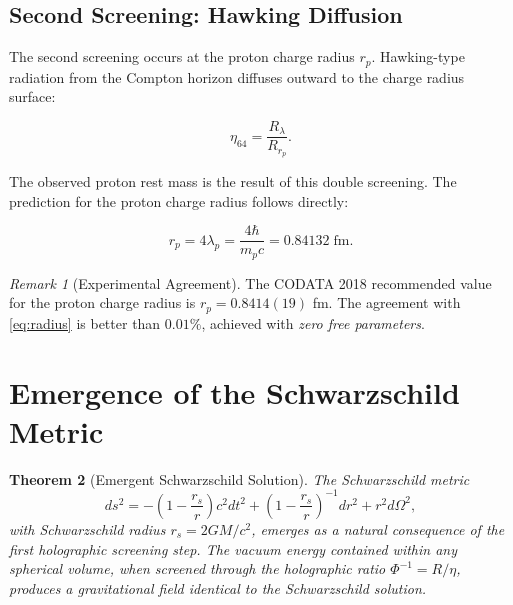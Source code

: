 \documentclass[12pt, a4paper]{article}
\theoremstyle{plain}
\newtheorem{theorem}{Theorem}[section]
\theoremstyle{definition}
\theoremstyle{remark}
\newtheorem{remark}[theorem]{Remark}
\newcommand{\rp}{r_p}
\begin{document}
\subsection{Second Screening: Hawking Diffusion}

The second screening occurs at the proton charge radius $\rp$. Hawking-type
radiation from the Compton horizon diffuses outward to the charge radius
surface:

\begin{equation}
  \eta_{64} = \frac{R_\lambda}{R_{\rp}}.
\end{equation}

The observed proton rest mass is the result of this double screening.
The prediction for the proton charge radius follows directly:

\begin{equation}\label{eq:radius}
  \rp = 4\lambda_p = \frac{4\hbar}{m_p c} = 0.84132 \; \text{fm}.
\end{equation}

\begin{remark}[Experimental Agreement]
  The CODATA 2018 recommended value \citep{CODATA2018} for the proton charge
  radius is $\rp = 0.8414(19)$ fm. The agreement with \eqref{eq:radius}
  is better than $0.01\%$, achieved with \emph{zero free parameters}.
\end{remark}

\section{Emergence of the Schwarzschild Metric}\label{sec:schwarzschild}

\begin{theorem}[Emergent Schwarzschild Solution]\label{thm:schwarzschild}
  The Schwarzschild metric
  \begin{equation}
    ds^2 = -\left(1 - \frac{r_s}{r}\right)c^2 dt^2
    + \left(1 - \frac{r_s}{r}\right)^{-1} dr^2
    + r^2 d\Omega^2,
  \end{equation}
  with Schwarzschild radius $r_s = 2GM/c^2$, emerges as a natural consequence
  of the first holographic screening step. The vacuum energy contained within
  any spherical volume, when screened through the holographic ratio
  $\Phi^{-1} = R/\eta$, produces a gravitational field identical to the
  Schwarzschild solution.
\end{theorem}
\end{document}
